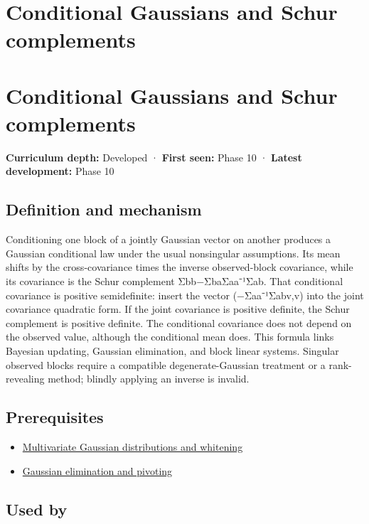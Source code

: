 \hypertarget{appendix-f0437ea55a47}{}
\section*{Conditional Gaussians and Schur complements}
\section{Conditional Gaussians and Schur complements}\label{appendix-f0437ea55a47-conditional-gaussians-and-schur-complements}

\textbf{Curriculum depth:} Developed · \textbf{First seen:} Phase 10 · \textbf{Latest development:} Phase 10

\subsection{Definition and mechanism}\label{appendix-f0437ea55a47-definition-and-mechanism}

Conditioning one block of a jointly Gaussian vector on another produces a Gaussian conditional law under the usual nonsingular assumptions. Its mean shifts by the cross-covariance times the inverse observed-block covariance, while its covariance is the Schur complement Σbb−ΣbaΣaa⁻¹Σab. That conditional covariance is positive semidefinite: insert the vector (−Σaa⁻¹Σabv,v) into the joint covariance quadratic form. If the joint covariance is positive definite, the Schur complement is positive definite. The conditional covariance does not depend on the observed value, although the conditional mean does. This formula links Bayesian updating, Gaussian elimination, and block linear systems. Singular observed blocks require a compatible degenerate-Gaussian treatment or a rank-revealing method; blindly applying an inverse is invalid.

\subsection{Prerequisites}\label{appendix-f0437ea55a47-prerequisites}

\begin{itemize}
\tightlist
\item
  \hyperref[appendix-12bbe185dbe5]{Multivariate Gaussian distributions and whitening}
\item
  \hyperref[appendix-f6e77f4a200f]{Gaussian elimination and pivoting}
\end{itemize}

\subsection{Used by}\label{appendix-f0437ea55a47-used-by}

